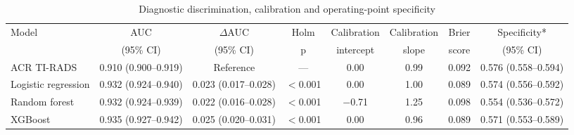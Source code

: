\begin{table}[htbp]
\caption{Diagnostic discrimination, calibration and operating-point specificity}\label{tab:diagnostic}
\footnotesize
\setlength{\tabcolsep}{3pt}
\begin{tabular*}{\textwidth}{@{\extracolsep{\fill}}lccccccc@{}}
\toprule
Model & AUC & $\Delta$AUC & Holm & Calibration & Calibration & Brier & Specificity* \\
 & (95\% CI) & (95\% CI) & p & intercept & slope & score & (95\% CI) \\
\midrule
ACR TI-RADS & 0.910 (0.900--0.919) & Reference & --- & 0.00 & 0.99 & 0.092 & 0.576 (0.558--0.594) \\
Logistic regression & 0.932 (0.924--0.940) & 0.023 (0.017--0.028) & $<$0.001 & 0.00 & 1.00 & 0.089 & 0.574 (0.556--0.592) \\
Random forest & 0.932 (0.924--0.939) & 0.022 (0.016--0.028) & $<$0.001 & $-$0.71 & 1.25 & 0.098 & 0.554 (0.536--0.572) \\
XGBoost & 0.935 (0.927--0.942) & 0.025 (0.020--0.031) & $<$0.001 & 0.00 & 0.96 & 0.089 & 0.571 (0.553--0.589) \\
\bottomrule
\end{tabular*}
\smallskip{}
\end{table}
